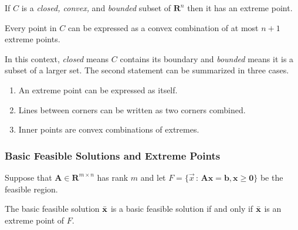 \begin{theorem}
If $C$ is a \emph{closed, convex,} and \emph{bounded} subset of $\mathbf{R}^n$ then it has an extreme point. 

Every point in $C$ can be expressed as a convex combination of at most $n+1$ extreme points.
\end{theorem}
In this context, \emph{closed} means $C$ contains its boundary and \emph{bounded} means it is a subset of a larger set. The second statement can be summarized in three cases.
\begin{enumerate}
    \item An extreme point can be expressed as itself.
    \item Lines between corners can be written as two corners combined.
    \item Inner points are convex combinations of extremes.
\end{enumerate}

\subsubsection{Basic Feasible Solutions and Extreme Points}
Suppose that $\mathbf{A}\in \mathbf{R}^{m\times n}$ has rank $m$ and let $F=\{\Vec{x}\,:\, \mathbf{Ax=b, x\geq 0}\}$ be the feasible region. 
\begin{theorem}
The basic feasible solution $\Bar{\mathbf{x}}$ is a basic feasible solution if and only if $\Bar{\mathbf{x}}$ is an extreme point of $F$. 
\end{theorem}

